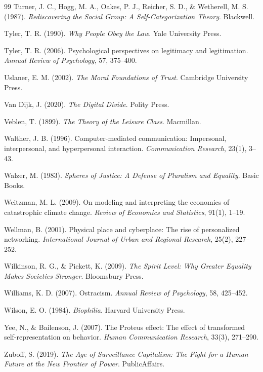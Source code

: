 \begin{thebibliography}{99}
Turner, J. C., Hogg, M. A., Oakes, P. J., Reicher, S. D., \& Wetherell, M. S. (1987).
\textit{Rediscovering the Social Group: A Self-Categorization Theory}.
Blackwell.

Tyler, T. R. (1990).
\textit{Why People Obey the Law}.
Yale University Press.

Tyler, T. R. (2006).
Psychological perspectives on legitimacy and legitimation.
\textit{Annual Review of Psychology}, 57, 375--400.

Uslaner, E. M. (2002).
\textit{The Moral Foundations of Trust}.
Cambridge University Press.

Van Dijk, J. (2020).
\textit{The Digital Divide}.
Polity Press.

Veblen, T. (1899).
\textit{The Theory of the Leisure Class}.
Macmillan.

Walther, J. B. (1996).
Computer-mediated communication: Impersonal, interpersonal, and hyperpersonal interaction.
\textit{Communication Research}, 23(1), 3--43.

Walzer, M. (1983).
\textit{Spheres of Justice: A Defense of Pluralism and Equality}.
Basic Books.

Weitzman, M. L. (2009).
On modeling and interpreting the economics of catastrophic climate change.
\textit{Review of Economics and Statistics}, 91(1), 1--19.

Wellman, B. (2001).
Physical place and cyberplace: The rise of personalized networking.
\textit{International Journal of Urban and Regional Research}, 25(2), 227--252.

Wilkinson, R. G., \& Pickett, K. (2009).
\textit{The Spirit Level: Why Greater Equality Makes Societies Stronger}.
Bloomsbury Press.

Williams, K. D. (2007).
Ostracism.
\textit{Annual Review of Psychology}, 58, 425--452.

Wilson, E. O. (1984).
\textit{Biophilia}.
Harvard University Press.

Yee, N., \& Bailenson, J. (2007).
The Proteus effect: The effect of transformed self-representation on behavior.
\textit{Human Communication Research}, 33(3), 271--290.

Zuboff, S. (2019).
\textit{The Age of Surveillance Capitalism: The Fight for a Human Future at the New Frontier of Power}.
PublicAffairs.

\end{thebibliography}

